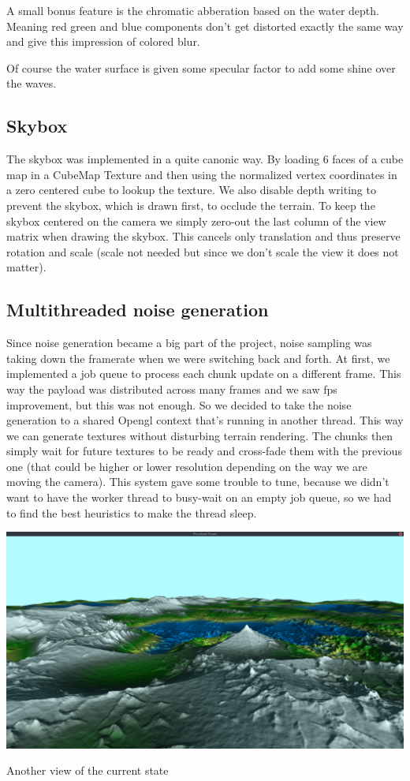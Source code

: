 \documentclass[11pt]{article}
\begin{document}
A small bonus feature is the chromatic abberation based on the water depth.
Meaning red green and blue components don't get distorted exactly the same way
and give this impression of colored blur.

Of course the water surface is given some specular factor to add some shine over
the waves.

\subsection{Skybox}

The skybox was implemented in a quite canonic way. By loading 6 faces of a cube
map in a CubeMap Texture and then using the normalized vertex coordinates in a
zero centered cube to lookup the texture. We also disable depth writing to
prevent the skybox, which is drawn first, to occlude the terrain. To keep the
skybox centered on the camera we simply zero-out the last column of the view
matrix when drawing the skybox. This cancels only translation and thus preserve
rotation and scale (scale not needed but since we don't scale the view it does
not matter).

\subsection{Multithreaded noise generation}

Since noise generation became a big part of the project, noise sampling was
taking down the framerate when we were switching back and forth. At first,
we implemented a job queue to process each chunk update on a different frame.
This way the payload was distributed across many frames and we saw fps
improvement, but this was not enough. So we decided to take the noise generation
to a shared Opengl context that's running in another thread. This way we can
generate textures without disturbing terrain rendering. The chunks then simply
wait for future textures to be ready and cross-fade them with the previous one
(that could be higher or lower resolution depending on the way we are moving the
camera). This system gave some trouble to tune, because we didn't want to have
the worker thread to busy-wait on an empty job queue, so we had to find the best
heuristics to make the thread sleep.

\begin{center}
\includegraphics[width=\textwidth]{screen01}
\caption{Another view of the current state}
\end{center} \\
\end{document}
